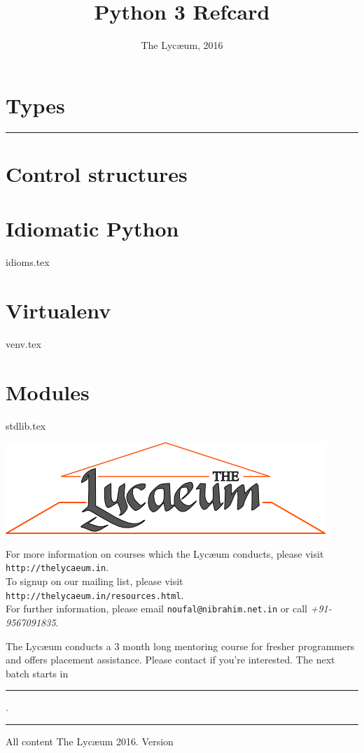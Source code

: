 \documentclass{refsheet}
\title{Python 3 Refcard}
\author{The Lyc\ae{}um, 2016}
\date{}
\begin{document}
\maketitle
\section{Types}







\noindent\rule{\linewidth}{0.05ex}
\section{Control structures}







\section{Idiomatic Python}
 {idioms.tex}

\section{Virtualenv}
 {venv.tex}

\section{Modules}
 {stdlib.tex}

\begin{center}
\includegraphics[scale=0.4]{images/parthenon-callig.png}
\end{center}
For more information on courses which the Lyc\ae{}um conducts, please
visit \texttt{http://thelycaeum.in}. \\To signup on our mailing list,
please visit \texttt{http://thelycaeum.in/resources.html}. \\For further
information, please email \texttt{noufal@nibrahim.net.in} or call
\textit{+91-9567091835}.
\vspace{0.5cm}

The Lyc\ae{}um conducts a 3 month long mentoring course for fresher
programmers and offers placement assistance. Please contact if you're
interested. The next batch starts in \rule{3cm}{0.1ex}.

\noindent\rule{\linewidth}{0.05ex}
\footnotesize All content \textcopyright The Lyc\ae{}um 2016. Version 
\end{document}
